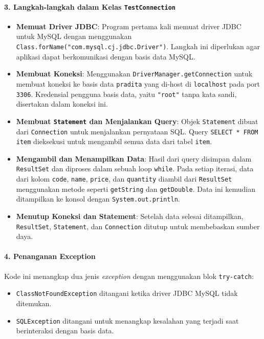 \paragraph{3. Langkah-langkah dalam Kelas \texttt{TestConnection}}
\begin{itemize}
	\item \textbf{Memuat Driver JDBC}: Program pertama kali memuat driver JDBC untuk MySQL dengan menggunakan \texttt{Class.forName("com.mysql.cj.jdbc.Driver")}. Langkah ini diperlukan agar aplikasi dapat berkomunikasi dengan basis data MySQL.
	
	\item \textbf{Membuat Koneksi}: Menggunakan \texttt{DriverManager.getConnection} untuk membuat koneksi ke basis data \texttt{pradita} yang di-host di \texttt{localhost} pada port \texttt{3306}. Kredensial pengguna basis data, yaitu \texttt{"root"} tanpa kata sandi, disertakan dalam koneksi ini.
	
	\item \textbf{Membuat \texttt{Statement} dan Menjalankan Query}: 
	Objek \texttt{Statement} dibuat dari \texttt{Connection} untuk menjalankan pernyataan SQL. Query \texttt{SELECT * FROM item} dieksekusi untuk mengambil semua data dari tabel \texttt{item}.
	
	\item \textbf{Mengambil dan Menampilkan Data}: 
	Hasil dari query disimpan dalam \texttt{ResultSet} dan diproses dalam sebuah loop \texttt{while}. Pada setiap iterasi, data dari kolom \texttt{code}, \texttt{name}, \texttt{price}, dan \texttt{quantity} diambil dari \texttt{ResultSet} menggunakan metode seperti \texttt{getString} dan \texttt{getDouble}. Data ini kemudian ditampilkan ke konsol dengan \texttt{System.out.println}.
	
	\item \textbf{Menutup Koneksi dan Statement}: Setelah data selesai ditampilkan, \texttt{ResultSet}, \texttt{Statement}, dan \texttt{Connection} ditutup untuk membebaskan sumber daya.
\end{itemize}

\paragraph{4. Penanganan Exception}
Kode ini menangkap dua jenis \textit{exception} dengan menggunakan blok \texttt{try-catch}: 
\begin{itemize}
	\item \texttt{ClassNotFoundException} ditangani ketika driver JDBC MySQL tidak ditemukan.
	\item \texttt{SQLException} ditangani untuk menangkap kesalahan yang terjadi saat berinteraksi dengan basis data.
\end{itemize}

